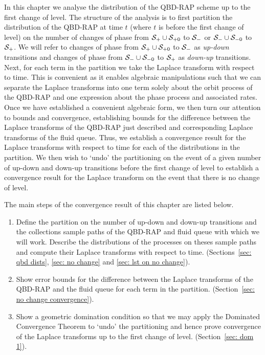 In this chapter we analyse the distribution of the QBD-RAP scheme up to the first change of level. The structure of the analysis is to first partition the distribution of the QBD-RAP at time \(t\) (where \(t\) is before the first change of level) on the number of changes of phase from \(\mathcal{S}_+\cup\mathcal{S}_{+0}\) to \(\mathcal{S}_-\) or \(\mathcal{S}_-\cup\mathcal{S}_{-0}\) to \(\mathcal{S}_+\). We will refer to changes of phase from \(\mathcal{S}_+\cup\mathcal{S}_{+0}\) to \(\mathcal{S}_-\) as \emph{up-down} transitions and changes of phase from \(\mathcal{S}_-\cup\mathcal{S}_{-0}\) to \(\mathcal{S}_+\) as \emph{down-up} transitions. Next, for each term in the partition we take the Laplace transform with respect to time. This is convenient as it enables algebraic manipulations such that we can separate the Laplace transforms into one term solely about the orbit process of the QBD-RAP and one expression about the phase process and associated rates. Once we have established a convenient algebraic form, we then turn our attention to bounds and convergence, establishing bounds for the difference between the Laplace transforms of the QBD-RAP just described and corresponding Laplace transforms of the fluid queue. Thus, we establish a convergence result for the Laplace transforms with respect to time for each of the distributions in the partition. We then wish to `undo' the partitioning on the event of a given number of up-down and down-up transitions before the first change of level to establish a convergence result for the Laplace transform on the event that there is no change of level. 

The main steps of the convergence result of this chapter are listed below.
\begin{enumerate}
	\item\label{step 1} Define the partition on the number of up-down and down-up transitions and the collections sample paths of the QBD-RAP and fluid queue with which we will work. Describe the distributions of the processes on theses sample paths and compute their Laplace transforms with respect to time. (Sections~\ref{sec: qbd dists}, \ref{sec: no change} and \ref{sec: lst on no change}).
	\item\label{step 2} Show error bounds for the difference between the Laplace transforms of the QBD-RAP and the fluid queue for each term in the partition. (Section~\ref{sec: no change convergence}).
	\item\label{step 3} Show a geometric domination condition so that we may apply the Dominated Convergence Theorem to `undo' the partitioning and hence prove convergence of the Laplace transforms up to the first change of level. (Section~\ref{sec: dom 1}).
\end{enumerate}

